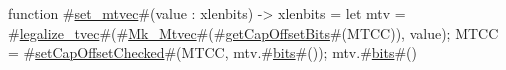 function #\hyperref[sailRISCVzsetzymtvec]{set\_mtvec}#(value : xlenbits) -> xlenbits = {
  let mtv = #\hyperref[sailRISCVzlegalizzezytvec]{legalize\_tvec}#(#\hyperref[sailRISCVzMkzyMtvec]{Mk\_Mtvec}#(#\hyperref[sailRISCVzgetCapOffsetBits]{getCapOffsetBits}#(MTCC)), value);
  MTCC = #\hyperref[sailRISCVzsetCapOffsetChecked]{setCapOffsetChecked}#(MTCC, mtv.#\hyperref[sailRISCVzbits]{bits}#());
  mtv.#\hyperref[sailRISCVzbits]{bits}#()
}
